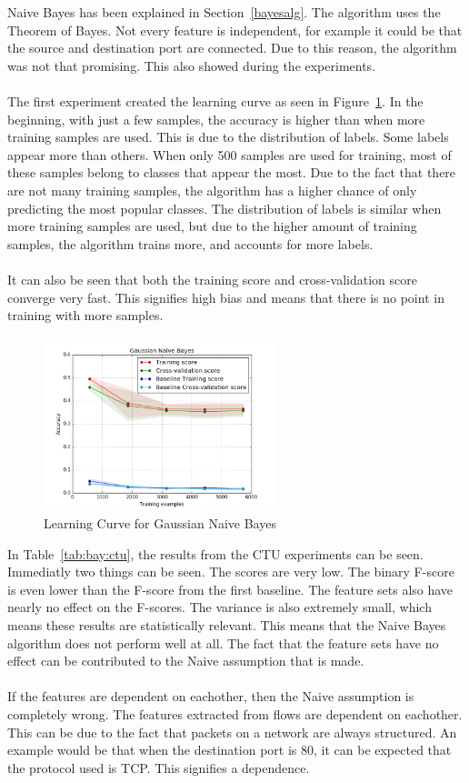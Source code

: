 Naive Bayes has been explained in Section~\ref{bayesalg}. The algorithm uses the Theorem of Bayes. Not every feature is independent, for example it could be that the source and destination port are connected. Due to this reason, the algorithm was not that promising. This also showed during the experiments. \\
\\
The first experiment created the learning curve as seen in Figure~\ref{fig:naiveBayes}. In the beginning, with just a few samples, the accuracy is higher than when more training samples are used. This is due to the distribution of labels. Some labels appear more than others. When only 500 samples are used for training, most of these samples belong to classes that appear the most. Due to the fact that there are not many training samples, the algorithm has a higher chance of only predicting the most popular classes. The distribution of labels is similar when more training samples are used, but due to the higher amount of training samples, the algorithm trains more, and accounts for more labels.\\
\\
It can also be seen that both the training score and cross-validation score converge very fast. This signifies high bias and means that there is no point in training with more samples. 
 \begin{figure}[H]
\centering
\includegraphics[width=0.6\textwidth]{Figures/Gaussian_Naive_Bayes}
\decoRule
\caption[Learning Curve for Gaussian Naive Bayes]{Learning Curve for Gaussian Naive Bayes}
\label{fig:naiveBayes}
\end{figure}

\noindent In Table~\ref{tab:bay:ctu}, the results from the CTU experiments can be seen. Immediatly two things can be seen. The scores are very low. The binary F-score is even lower than the F-score from the first baseline. The feature sets also have nearly no effect on the F-scores. The variance is also extremely small, which means these results are statistically relevant. This means that the Naive Bayes algorithm does not perform well at all. The fact that the feature sets have no effect can be contributed to the Naive assumption that is made. 	\\
\\
If the features are dependent on eachother, then the Naive assumption is completely wrong. The features extracted from flows are dependent on eachother. This can be due to the fact that packets on a network are always structured. An example would be that when the destination port is $80$, it can be expected that the protocol used is TCP. This signifies a dependence. 

